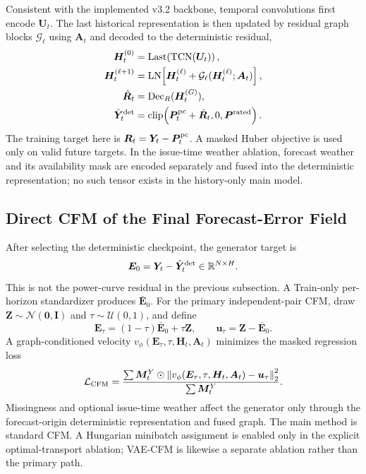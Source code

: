 \documentclass[journal]{IEEEtran}
\newcommand{\R}{\mathbb{R}}
\begin{document}
Consistent with the implemented v3.2 backbone, temporal convolutions first encode $\bm U_t$. The last historical representation is then updated by residual graph blocks $\mathcal G_\ell$ using $\bm A_t$ and decoded to the deterministic residual,
\begin{align}
\bm H_t^{(0)}&=\operatorname{Last}\!\left(\operatorname{TCN}(\bm U_t)\right),\nonumber\\
\bm H_t^{(\ell+1)}&=\operatorname{LN}\!\left[\bm H_t^{(\ell)}+
\mathcal G_\ell(\bm H_t^{(\ell)};\bm A_t)\right],\nonumber\\
\hat{\bm R}_t&=\operatorname{Dec}_R(\bm H_t^{(G)}),\nonumber\\
\hat{\bm Y}^{\rm det}_t&=\operatorname{clip}\!\left(
\bm P^{\rm pc}_t+\hat{\bm R}_t,0,\bm P^{\rm rated}\right).
\label{eq:det_center}
\end{align}
The training target here is $\bm R_t=\bm Y_t-\bm P^{\rm pc}_t$. A masked Huber objective is used only on valid future targets. In the issue-time weather ablation, forecast weather and its availability mask are encoded separately and fused into the deterministic representation; no such tensor exists in the history-only main model.

\subsection{Direct CFM of the Final Forecast-Error Field}

After selecting the deterministic checkpoint, the generator target is
\begin{equation}
\bm E_0=\bm Y_t-\hat{\bm Y}^{\rm det}_t\in\R^{N\times H}.
\label{eq:final_error}
\end{equation}
This is not the power-curve residual in the previous subsection. A Train-only per-horizon standardizer produces $\bar{\bm E}_0$. For the primary independent-pair CFM, draw $\bm Z\sim\mathcal N(\bm0,\bm I)$ and $\tau\sim\mathcal U(0,1)$, and define
\begin{equation}
\bm E_\tau=(1-\tau)\bar{\bm E}_0+\tau\bm Z,
\qquad
\bm u_\tau=\bm Z-\bar{\bm E}_0.
\label{eq:cfm_path}
\end{equation}
A graph-conditioned velocity $v_\phi(\bm E_\tau,\tau,\bm H_t,\bm A_t)$ minimizes the masked regression loss
\begin{equation}
\mathcal L_{\rm CFM}=\frac{
\sum \bm M^Y_t\odot
\left\|v_\phi(\bm E_\tau,\tau,\bm H_t,\bm A_t)-\bm u_\tau\right\|_2^2}
{\sum \bm M^Y_t}.
\label{eq:cfm_loss}
\end{equation}
Missingness and optional issue-time weather affect the generator only through the forecast-origin deterministic representation and fused graph. The main method is standard CFM. A Hungarian minibatch assignment is enabled only in the explicit optimal-transport ablation; VAE-CFM is likewise a separate ablation rather than the primary path.
\end{document}
